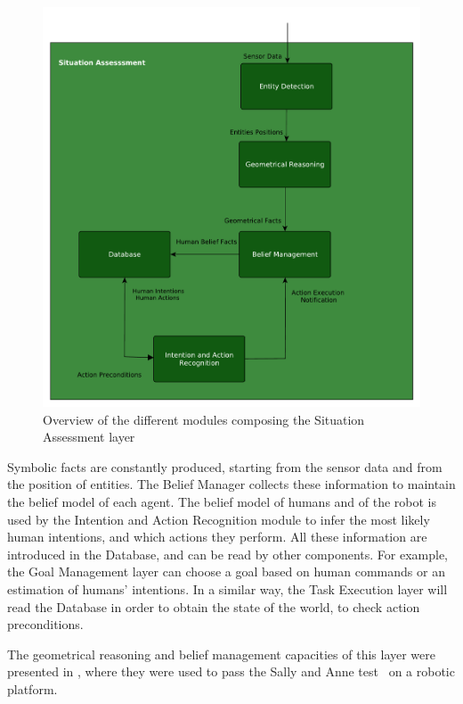  \begin{figure}[ht!]
	\centering
	\includegraphics[scale=0.45]{img/observer/situation_assessment_overview.pdf}
	\caption{Overview of the different modules composing the Situation Assessment layer}
	\label{fig:belief_management-belief_management_overview}
\end{figure}

Symbolic facts are constantly produced, starting from the sensor data and from the position of entities. The Belief Manager collects these information to maintain the belief model of each agent. The belief model of humans and of the robot is used by the Intention and Action Recognition module to infer the most likely human intentions, and which actions they perform. All these information are introduced in the Database, and can be read by other components. For example, the Goal Management layer can choose a goal based on human commands or an estimation of humans' intentions. In a similar way, the Task Execution layer will read the Database in order to obtain the state of the world, to check action preconditions.  

The geometrical reasoning and belief management capacities of this layer were presented in \cite{Milliez2014}, where they were used to pass the Sally and Anne test~\cite{Baron1985} on a robotic platform. 

